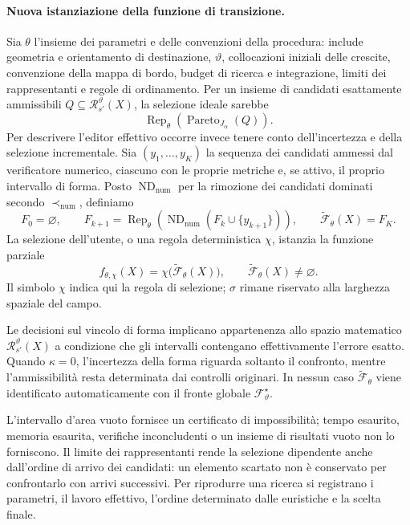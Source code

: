 \documentclass[11pt,a4paper]{article}
\newcommand{\Pareto}{\operatorname{Pareto}}
\begin{document}
\paragraph{Nuova istanziazione della funzione di transizione.}
Sia $\theta$ l'insieme dei parametri e delle convenzioni della procedura: include geometria e orientamento di destinazione, $\vartheta$, collocazioni iniziali delle crescite, convenzione della mappa di bordo, budget di ricerca e integrazione, limiti dei rappresentanti e regole di ordinamento. Per un insieme di candidati esattamente ammissibili $Q\subseteq\mathcal R_{s'}^{\vartheta}(X)$, la selezione ideale sarebbe
\[
\operatorname{Rep}_{\theta}\!\left(\Pareto_{J_\alpha}(Q)\right).
\]
Per descrivere l'editor effettivo occorre invece tenere conto dell'incertezza e della selezione incrementale. Sia $(y_1,\ldots,y_K)$ la sequenza dei candidati ammessi dal verificatore numerico, ciascuno con le proprie metriche e, se attivo, il proprio intervallo di forma. Posto $\operatorname{ND}_{\mathrm{num}}$ per la rimozione dei candidati dominati secondo $\prec_{\mathrm{num}}$, definiamo
\[
F_0=\varnothing,\qquad
F_{k+1}=\operatorname{Rep}_{\theta}\!\left(
\operatorname{ND}_{\mathrm{num}}(F_k\cup\{y_{k+1}\})\right),
\qquad \widetilde{\mathcal F}_{\theta}(X)=F_K.
\]
La selezione dell'utente, o una regola deterministica $\chi$, istanzia la funzione parziale
\[
\boxed{f_{\theta,\chi}(X)=
\chi\bigl(\widetilde{\mathcal F}_{\theta}(X)\bigr),
\qquad \widetilde{\mathcal F}_{\theta}(X)\neq\varnothing.}
\]
Il simbolo $\chi$ indica qui la regola di selezione; $\sigma$ rimane riservato alla larghezza spaziale del campo.

Le decisioni sul vincolo di forma implicano appartenenza allo spazio matematico $\mathcal R_{s'}^{\vartheta}(X)$ a condizione che gli intervalli contengano effettivamente l'errore esatto. Quando $\kappa=0$, l'incertezza della forma riguarda soltanto il confronto, mentre l'ammissibilità resta determinata dai controlli originari. In nessun caso $\widetilde{\mathcal F}_{\theta}$ viene identificato automaticamente con il fronte globale $\mathcal F^{\star}_{\vartheta}$.

L'intervallo d'area vuoto fornisce un certificato di impossibilità; tempo esaurito, memoria esaurita, verifiche inconcludenti o un insieme di risultati vuoto non lo forniscono. Il limite dei rappresentanti rende la selezione dipendente anche dall'ordine di arrivo dei candidati: un elemento scartato non è conservato per confrontarlo con arrivi successivi. Per riprodurre una ricerca si registrano i parametri, il lavoro effettivo, l'ordine determinato dalle euristiche e la scelta finale.
\end{document}
